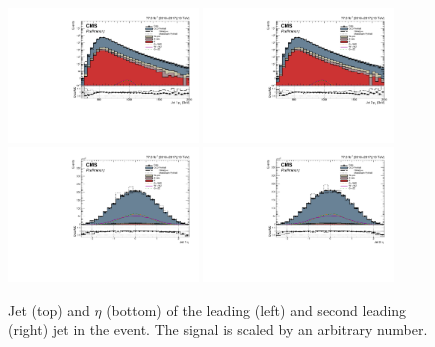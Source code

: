 \begin{figure}[h!]
\centering
\includegraphics[width=0.450\textwidth]{figures/analysis/search3/AN-17-303/controlPlots/looseSel_Jet_1_p_T.pdf}
\includegraphics[width=0.450\textwidth]{figures/analysis/search3/AN-17-303/controlPlots/looseSel_Jet_2_p_T.pdf}\\
\includegraphics[width=0.450\textwidth]{figures/analysis/search3/AN-17-303/controlPlots/looseSel_Jet_1_eta.pdf}
\includegraphics[width=0.450\textwidth]{figures/analysis/search3/AN-17-303/controlPlots/looseSel_Jet_2_eta.pdf}
\caption{Jet \PT{} (top) and $\eta$ (bottom) of the leading (left) and second leading (right) jet in the event. The signal is scaled by an arbitrary number.}
\label{fig:kinematics-all}
\end{figure}

